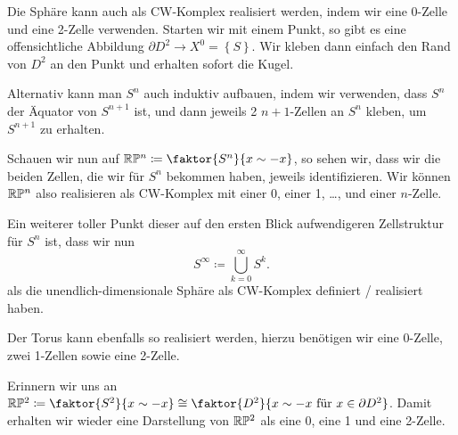 \begin{example}
    Die Sphäre kann auch als CW-Komplex realisiert werden, indem wir eine 0-Zelle und eine 2-Zelle verwenden. Starten wir mit einem Punkt, so gibt es eine offensichtliche Abbildung $\partial D^2 \to  X^0 = \left \{S\right\} $. Wir kleben dann einfach den Rand von $D^2$ an den Punkt und erhalten sofort die Kugel.

    Alternativ kann man $S^n$ auch induktiv aufbauen, indem wir verwenden, dass  $S^n$ der Äquator von  $S^{n+1}$ ist, und dann jeweils 2 $n+1$-Zellen an  $S^n$ kleben, um  $S^{n+1}$ zu erhalten.

    Schauen wir nun auf $\R\mathbb{P}^n \coloneqq  \faktor{S^n}{x \sim -x}$, so sehen wir, dass wir die beiden Zellen, die wir für $S^n$ bekommen haben, jeweils identifizieren. Wir können  $\mathbb{R}\mathbb{P}^n$ also realisieren als CW-Komplex mit einer 0, einer 1, \ldots, und einer $n$-Zelle.

    Ein weiterer toller Punkt dieser auf den ersten Blick aufwendigeren Zellstruktur für  $S^n $ ist, dass wir nun
    \[
    S^{\infty} \coloneqq  \bigcup_{k=0}^{\infty} S^k 
    .\] 
    als die unendlich-dimensionale Sphäre als CW-Komplex definiert / realisiert haben.

    Der Torus kann ebenfalls so realisiert werden, hierzu benötigen wir eine 0-Zelle, zwei 1-Zellen sowie eine 2-Zelle.

    Erinnern wir uns an $\R\mathbb{P}^2 \coloneqq  \faktor{S^2}{x \sim  -x} \cong \faktor{D^2}{x \sim  -x \text{ für }x \in \partial D^2}$. Damit erhalten wir wieder eine Darstellung von $\mathbb{R}\mathbb{P}^2$ als eine 0, eine 1 und eine 2-Zelle.
\end{example}
